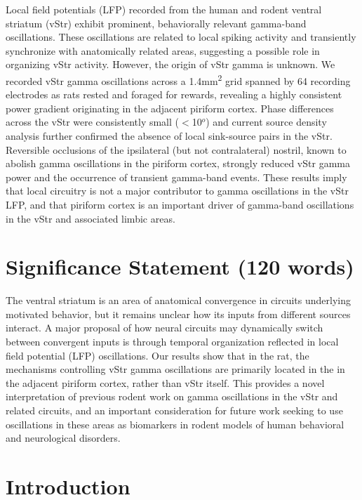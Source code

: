 \documentclass[11pt]{article}
\makeatletter
\newcommand{\degree}{$^o$\@\xspace}
\makeatother
\begin{document}
Local field potentials (LFP) recorded from the human and rodent
ventral striatum (vStr) exhibit prominent, behaviorally relevant
gamma-band oscillations. These oscillations are related to local
spiking activity and transiently synchronize with anatomically related
areas, suggesting a possible role in organizing vStr
activity. However, the origin of vStr gamma is unknown. We recorded
vStr gamma oscillations across a 1.4mm\textsuperscript{2} grid spanned
by 64 recording electrodes as rats rested and foraged for rewards,
revealing a highly consistent power gradient originating in the
adjacent piriform cortex. Phase differences across the vStr were
consistently small ($<$10\degree) and current source density analysis
further confirmed the absence of local sink-source pairs in the
vStr. Reversible occlusions of the ipsilateral (but not contralateral)
nostril, known to abolish gamma oscillations in the piriform cortex,
strongly reduced vStr gamma power and the occurrence of transient
gamma-band events. These results imply that local circuitry is not a
major contributor to gamma oscillations in the vStr LFP, and that
piriform cortex is an important driver of gamma-band oscillations in
the vStr and associated limbic areas.

\section*{Significance Statement (120 words)}

The ventral striatum is an area of anatomical convergence in circuits
underlying motivated behavior, but it remains unclear how its inputs
from different sources interact. A major proposal of how neural
circuits may dynamically switch between convergent inputs is through
temporal organization reflected in local field potential (LFP)
oscillations. Our results show that in the rat, the mechanisms
controlling vStr gamma oscillations are primarily located in the in
the adjacent piriform cortex, rather than vStr itself. This provides a
novel interpretation of previous rodent work on gamma oscillations in
the vStr and related circuits, and an important consideration for
future work seeking to use oscillations in these areas as biomarkers
in rodent models of human behavioral and neurological disorders.

\newpage

\section*{Introduction}
\end{document}
